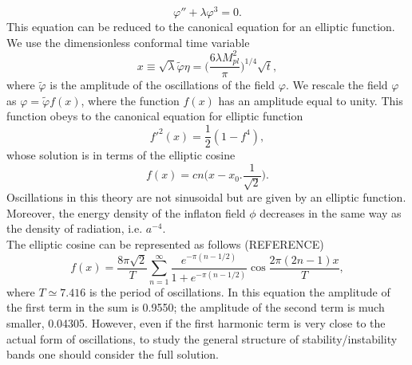 \documentclass[11pt,a4paper,twoside]{book}
\begin{document}
 \begin{equation}
 	\label{Chap4:labdaPhi4_eomPhi3}
 	\varphi'' + \lambda\varphi^{3}=0.
 \end{equation}
 This equation can be reduced to the canonical equation for an elliptic function. We use the dimensionless conformal time variable
 \begin{equation}
\label{Chap4:lambdaPhi4_conformalTimeVariable}
x\equiv \sqrt{\lambda} \tilde{\varphi}\eta = \Bigg( \frac{6\lambda M_{pl}^{2}}{\pi}\Bigg)^{1/4}\sqrt{t},
 \end{equation}
 where $\tilde{\varphi}$ is the amplitude of the oscillations of the field $\varphi$. We rescale the field $\varphi$ as $\varphi=\tilde{\varphi}f(x)$, where the function $ f(x) $ has an amplitude equal to unity. This function  obeys to the canonical equation for elliptic function
 \begin{equation}
 	\label{chap4:lambdaPhi4_EllipticFunction}
 	f'^{2}(x)=\frac{1}{2}(1-f^{4}),
 \end{equation}
 whose solution is in terms of the elliptic cosine
 \begin{equation}
\label{Chap4:lambdaPhi4_solutionF(x)}
	f(x)=cn\Bigg(x-x_{0}.\frac{1}{\sqrt{2}}\Bigg).
 \end{equation}
 Oscillations in this theory are not sinusoidal but are given by an elliptic function. Moreover, the energy density of the inflaton field $\phi$ decreases in the same way as the density of radiation, i.e. $ a^{-4} $.\\
 The elliptic cosine can be represented as follows (REFERENCE)
 \begin{equation}
\label{Chap4:lambdaPhi4_EllipticCosineForm}
f(x)=\frac{8\pi\sqrt{2}}{T}\sum_{n=1}^{\infty}\frac{e^{-\pi(n-1/2)}}{1+e^{-\pi (n-1/2)}}\cos \frac{2\pi (2n-1)x}{T},
 \end{equation}
 where $ T \simeq 7.416 $ is the period of oscillations. In this equation the amplitude of the first term in the sum is 0.9550; the amplitude of the second term is much smaller, 0.04305. However, even if the first harmonic term is very close to the actual form of oscillations, to study the general structure of stability/instability bands one should consider the full solution.\\
\end{document}
